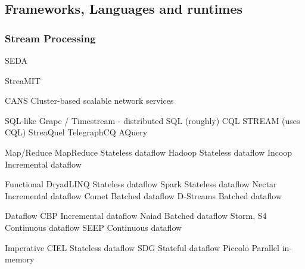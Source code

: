 \subsection{Frameworks, Languages and runtimes}

\subsubsection{Stream Processing}

SEDA

StreaMIT

CANS Cluster-based scalable network services

SQL-like
  Grape / Timestream - distributed SQL (roughly)
  CQL
  STREAM (uses CQL)
  StreaQuel
  TelegraphCQ
  AQuery

Map/Reduce
  MapReduce    Stateless dataflow
  Hadoop       Stateless dataflow
  Incoop       Incremental dataflow

Functional
  DryadLINQ    Stateless dataflow
  Spark        Stateless dataflow
  Nectar       Incremental dataflow
  Comet        Batched dataflow
  D-Streams    Batched dataflow

Dataflow
  CBP          Incremental dataflow
  Naiad        Batched dataflow
  Storm, S4    Continuous dataflow
  SEEP         Continuous dataflow

Imperative
  CIEL         Stateless dataflow
  SDG          Stateful dataflow
  Piccolo      Parallel in-memory